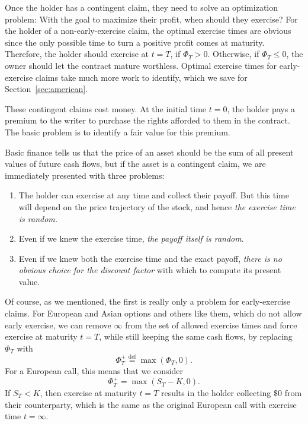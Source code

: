 \documentclass[11pt, openany, oneside]{book}
\theoremstyle{definition}
\theoremstyle{remark}
\theoremstyle{boldital}
\numberwithin{equation}{section}
\begin{document}
Once the holder has a contingent claim, they need to solve an optimization problem: With the goal to maximize their profit, when  should they exercise? For the holder of a non-early-exercise claim, the optimal exercise times are obvious since the only possible time to turn a positive profit comes at maturity. Therefore, the holder should exercise at $t=T$, if $\Phi_T>0$. Otherwise, if $\Phi_T \leq 0$, the owner should let the contract mature worthless. Optimal exercise times for early-exercise claims take much more work to identify, which we save for Section~\ref{sec:american}.

These contingent claims cost money. At the initial time $t=0$, the holder pays a premium to the writer to purchase the rights afforded to them in the contract. The basic problem is to identify a fair value for this premium.

Basic finance tells us that the price of an asset should be the sum of all present values of future cash flows, but if the asset is a contingent claim, we are immediately presented with three problems:
\begin{enumerate}
\item The holder can exercise at any time and collect their payoff. But this time will depend on the price trajectory of the stock, and hence \textit{the exercise time is random.}
\item Even if we knew the exercise time, \textit{the payoff itself is random}.
\item Even if we knew both the exercise time and the exact payoff, \textit{there is no obvious choice for the discount factor} with which to compute its present value.
\end{enumerate}
Of course, as we mentioned, the first is really only a problem for early-exercise claims. For European and Asian options and others like them, which do not allow early exercise, we can remove $\infty$ from the set of allowed exercise times and force exercise at maturity $t=T$, while still keeping the same cash flows, by replacing $\Phi_T$ with
	\begin{equation}\label{eq:zero-trick}
	\Phi_T^+ \stackrel{\text{def}}{=} \max{\left(\Phi_T, 0\right)}.
	\end{equation}
For a European call, this means that we consider
	\[
	\Phi_T^+ = \max{\left(S_T - K, 0 \right)}.
	\]
If $S_T< K$, then exercise at maturity $t=T$ results in the holder collecting $\$0$ from their counterparty, which is the same as the original European call with exercise time $t=\infty$.
\end{document}
